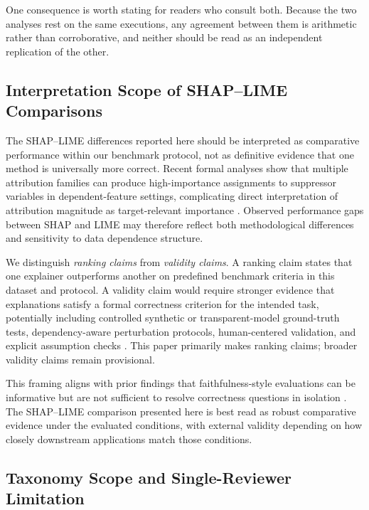 \documentclass[10pt]{article}
\begin{document}
One consequence is worth stating for readers who consult both. Because the
two analyses rest on the same executions, any agreement between them is
arithmetic rather than corroborative, and neither should be read as an
independent replication of the other.

\subsection{Interpretation Scope of SHAP--LIME Comparisons}
\label{sec:interpretation_scope}

The SHAP--LIME differences reported here should be interpreted as
comparative performance within our benchmark protocol, not as definitive
evidence that one method is universally more correct. Recent formal
analyses show that multiple attribution families can produce
high-importance assignments to suppressor variables in
dependent-feature settings, complicating direct interpretation of
attribution magnitude as target-relevant importance
\citep{wilming2022scrutinizing,wilming2023theoretical,haufe2026formalization}.
Observed performance gaps between SHAP and LIME may therefore reflect both
methodological differences and sensitivity to data dependence structure.

We distinguish \emph{ranking claims} from \emph{validity claims}. A
ranking claim states that one explainer outperforms another on predefined
benchmark criteria in this dataset and protocol. A validity claim would
require stronger evidence that explanations satisfy a formal correctness
criterion for the intended task, potentially including controlled
synthetic or transparent-model ground-truth tests, dependency-aware
perturbation protocols, human-centered validation, and explicit assumption checks
\citep{haufe2026formalization,doshivelez2017rigorous}. This paper
primarily makes ranking claims; broader validity claims remain provisional.

This framing aligns with prior findings that faithfulness-style evaluations
can be informative but are not sufficient to resolve correctness questions
in isolation \citep{jacovi2020faithfulness,adebayo2018sanity,
hooker2019benchmark,rong2022consistent}. The SHAP--LIME comparison
presented here is best read as robust comparative evidence under the
evaluated conditions, with external validity depending on how closely
downstream applications match those conditions.

\subsection{Taxonomy Scope and Single-Reviewer Limitation}
\end{document}
